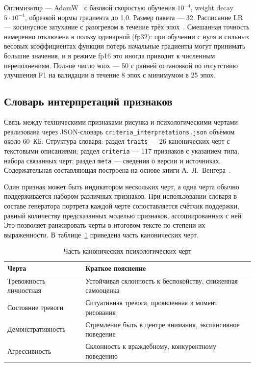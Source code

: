 Оптимизатор --- AdamW~\cite{adamw,adam} с базовой скоростью обучения $10^{-4}$, weight decay $5 \cdot 10^{-4}$, обрезкой нормы градиента до 1,0. Размер пакета --- 32. Расписание LR --- косинусное затухание с разогревом в течение трёх эпох~\cite{cosine-schedule}. Смешанная точность намеренно отключена в пользу одинарной (fp32): при обучении с нуля и сильных весовых коэффициентах функции потерь начальные градиенты могут принимать большие значения, и в режиме fp16 это иногда приводит к численным переполнениям. Полное число эпох --- 50 с ранней остановкой по отсутствию улучшения F1 на валидации в течение 8 эпох с минимумом в 25 эпох.

\subsection{Словарь интерпретаций признаков}

Связь между техническими признаками рисунка и психологическими чертами реализована через JSON-словарь \texttt{criteria\_interpretations.json} объёмом около 60~КБ. Структура словаря: раздел \texttt{traits} --- 26 канонических черт с текстовыми описаниями; раздел \texttt{criteria} --- 117 признаков с указанием типа, набора связанных черт; раздел \texttt{meta} --- сведения о версии и источниках. Содержательная составляющая построена на основе книги А.~Л.~Венгера~\cite{venger}.

Один признак может быть индикатором нескольких черт, а одна черта обычно поддерживается набором различных признаков. При использовании словаря в составе генератора портрета каждой черте сопоставляется счётчик поддержки, равный количеству предсказанных моделью признаков, ассоциированных с ней. Это позволяет ранжировать черты в итоговом тексте по степени их выраженности. В таблице~\ref{traits-list} приведена часть канонических черт.

\begin{table}
    \caption{Часть канонических психологических черт}
    \fontsize{12pt}{14pt}\selectfont
    \begin{tabular}{|p{60mm}|p{90mm}|}\hline
        \textbf{Черта} & \textbf{Краткое пояснение} \\ \hline
        Тревожность личностная           & Устойчивая склонность к беспокойству, сниженная самооценка \\ \hline
        Состояние тревоги                & Ситуативная тревога, проявленная в момент рисования \\ \hline
        Демонстративность                & Стремление быть в центре внимания, экспансивное поведение \\ \hline
        Агрессивность                    & Склонность к враждебному, конкурентному поведению \\ \hline
    \end{tabular}
    \label{traits-list}
\end{table}

